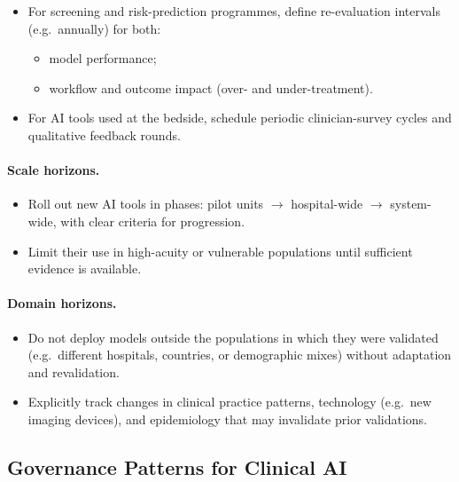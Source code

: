 \begin{itemize}
  \item For screening and risk-prediction programmes, define
        re-evaluation intervals (e.g.\ annually) for both:
        \begin{itemize}
          \item model performance;
          \item workflow and outcome impact (over- and under-treatment).
        \end{itemize}
  \item For AI tools used at the bedside, schedule periodic
        clinician-survey cycles and qualitative feedback rounds.
\end{itemize}

\paragraph{Scale horizons.}

\begin{itemize}
  \item Roll out new AI tools in phases:
        pilot units $\to$ hospital-wide $\to$ system-wide, with clear
        criteria for progression.
  \item Limit their use in high-acuity or vulnerable populations until
        sufficient evidence is available.
\end{itemize}

\paragraph{Domain horizons.}

\begin{itemize}
  \item Do not deploy models outside the populations in which they were
        validated (e.g.\ different hospitals, countries, or demographic
        mixes) without adaptation and revalidation.
  \item Explicitly track changes in clinical practice patterns,
        technology (e.g.\ new imaging devices), and epidemiology that
        may invalidate prior validations.
\end{itemize}

\subsection{Governance Patterns for Clinical AI}

